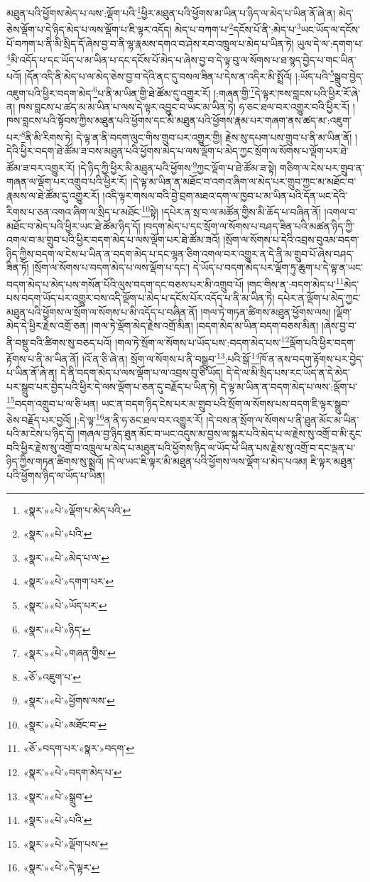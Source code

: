 མཐུན་པའི་ཕྱོགས་མེད་པ་ལས་:ལྡོག་པའི་\footnote{«སྣར་»«པེ་»ལྡོག་པ་མེད་པའི་}ཕྱིར་མཐུན་པའི་ཕྱོགས་མ་ཡིན་པ་ཉིད་ལ་མེད་པ་ཡིན་ནོ་ཞེ་ན། མེད་ཅེས་ལྡོག་པ་དེ་ཉིད་མེད་པ་ལས་ལྡོག་པ་ཇི་ལྟར་འདོད། མེད་པ་བཀག་པ་\footnote{«སྣར་»«པེ་»པའི་}དངོས་པོ་ནི་:མེད་པ་\footnote{«སྣར་»«པེ་»མེད་པ་ལ་}ཡང་ཡོད་ལ་དངོས་པོ་བཀག་པ་ནི་མི་སྲིད་དོ་ཞེས་བྱ་བ་ནི་ལྷ་རྣམས་དགའ་བ་ཤེས་རབ་འཁྲུལ་པ་མེད་པ་ཡིན་ཏེ། ཡུལ་དེ་ལ་:དགག་པ་\footnote{«སྣར་»«པེ་»དགག་པར་}མི་འདོད་པ་དང་ཡོད་པ་མ་ཡིན་པ་དང་དངོས་པོ་མེད་པ་ཞེས་བྱ་བ་དེ་ལྟ་བུ་ལ་སོགས་པ་ཐ་སྙད་བྱེད་པ་གང་ཡིན་པའོ། །དོན་འདི་ནི་མེད་པ་ལ་མེད་ཅེས་བྱ་བ་དེའི་ནང་དུ་བསལ་ཟིན་པ་དེས་ན་འདིར་མི་སྤྲོའོ། །:ཡོད་པའི་\footnote{«སྣར་»«པེ་»ཡོད་པར་}སྒྲུབ་བྱེད་འཇུག་པའི་ཕྱིར་བདག་མེད་\footnote{«སྣར་»«པེ་»ཉིད་}པ་ནི་མ་ཡིན་གྱི་ཐེ་ཚོམ་དུ་འགྱུར་རོ། །:གཞན་གྱི་\footnote{«སྣར་»«པེ་»གཞན་གྱིས་}དེ་ལྟར་ཁས་བླངས་པའི་ཕྱིར་རོ་ཞེ་ན། ཁས་བླངས་པ་ཚད་མ་མ་ཡིན་པ་ལས་དེ་ལྟར་འབྱུང་བ་ཡང་མ་ཡིན་ཏེ། ཧ་ཅང་ཐལ་བར་འགྱུར་བའི་ཕྱིར་རོ། །ཁས་བླངས་པའི་སྟོབས་ཀྱིས་མཐུན་པའི་ཕྱོགས་དང་མི་མཐུན་པའི་ཕྱོགས་རྣམ་པར་གཞག་ནས་ཚད་མ་:འཇུག་པར་\footnote{«ཅོ་»འཇུག་པ་}ནི་མི་རིགས་ཏེ། དེ་ལྟ་ན་ནི་བདག་ལུང་གིས་གྲུབ་པར་འགྱུར་གྱི། རྗེས་སུ་དཔག་པས་གྲུབ་པ་ནི་མ་ཡིན་ནོ། །དེའི་ཕྱིར་བདག་ཐེ་ཚོམ་ཟ་བས་མཐུན་པའི་ཕྱོགས་མེད་པ་ལས་ལྡོག་པ་མེད་ཀྱང་སྲོག་ལ་སོགས་པ་ལྡོག་པར་ཐེ་ཚོམ་ཟ་བར་འགྱུར་རོ། །དེ་ཉིད་ཀྱི་ཕྱིར་མི་མཐུན་པའི་ཕྱོགས་\footnote{«སྣར་»«པེ་»ཕྱོགས་ལས་}ཀྱང་ལྡོག་པ་ཐེ་ཚོམ་ཟ་སྟེ། གཅིག་ལ་ངེས་པར་གྲུབ་ན་གཞན་ལ་ལྡོག་པར་འགྲུབ་པའི་ཕྱིར་རོ། །དེ་ལྟ་མ་ཡིན་ན་མཐོང་བ་འགའ་ཞིག་ལ་མེད་པར་གྲུབ་ཀྱང་མ་མཐོང་བ་རྣམས་ལ་ཐེ་ཚོམ་དུ་འགྱུར་རོ། །འདི་ལྟར་གསལ་བའི་བྱེ་བྲག་མཐའ་དག་ལ་ཁྱབ་པ་མ་ཡིན་པའི་དོན་ཡང་དེའི་རིགས་པ་ཅན་འགའ་ཞིག་ལ་སྲིད་པ་མཐོང་\footnote{«སྣར་»«པེ་»མཐོང་བ་}སྟེ། །དཔེར་ན་སྲ་བ་ལ་མཚོན་གྱིས་མི་ཆོད་པ་བཞིན་ནོ། །འགལ་བ་མཐོང་བ་མེད་པའི་ཕྱིར་ཡང་ཐེ་ཚོམ་ཉིད་དོ། །བདག་མེད་པ་དང་སྲོག་ལ་སོགས་པ་བཤད་ཟིན་པའི་མཚན་ཉིད་ཀྱི་འགལ་བ་མ་གྲུབ་པའི་ཕྱིར་བདག་མེད་པ་ལས་ལྡོག་པར་ཐེ་ཚོམ་ཟའོ། །སྲོག་ལ་སོགས་པ་དེའི་འབྲས་བུའམ་བདག་ཉིད་ཀྱིས་བདག་ལ་ངེས་པ་ཡིན་ན་བདག་མེད་པ་དང་ལྷན་ཅིག་འགལ་བར་འགྱུར་ན་དེ་ནི་མ་གྲུབ་པོ་ཞེས་བཤད་ཟིན་ཏོ། །སྲོག་ལ་སོགས་པ་བདག་མེད་པ་ལས་ལྡོག་པ་དང་། དེ་ཡོད་པ་བདག་མེད་པར་ལྡོག་ཏུ་ཆུག་པ་དེ་ལྟ་ན་ཡང་བདག་མེད་པ་མེད་པས་གསོན་པོའི་ལུས་བདག་དང་བཅས་པར་མི་འགྲུབ་པོ། །གང་གིས་ན་:བདག་མེད་པ་\footnote{«ཅོ་»བདག་པར་«སྣར་»བདག་}མེད་པས་བདག་ཡོད་པར་འགྱུར་བས་འདི་ལྡོག་པ་མེད་པ་དངོས་པོར་འདོད་པ་ནི་མ་ཡིན་ཏེ། དཔེར་ན་ལྡོག་པ་མེད་ཀྱང་མཐུན་པའི་ཕྱོགས་ལ་སྲོག་ལ་སོགས་པ་མི་འདོད་པ་བཞིན་ནོ། །གལ་ཏེ་གཏན་ཚིགས་མཐུན་ཕྱོགས་ལས། །ལྡོག་མེད་དེ་ཕྱིར་རྗེས་འགྲོ་ཅན། །གལ་ཏེ་ལྡོག་མེད་རྗེས་འགྲོ་མིན། །བདག་མེད་མ་ཡིན་བདག་བཅས་མིན། །ཞེས་བྱ་བ་ནི་བསྡུ་བའི་ཚིགས་སུ་བཅད་པའོ། །གལ་ཏེ་སྲོག་ལ་སོགས་པ་ཡོད་པས་:བདག་མེད་པས་\footnote{«སྣར་»«པེ་»བདག་མེད་པ་}ལྡོག་པའི་ཕྱིར་བདག་རྟོགས་པ་ནི་མ་ཡིན་ནོ། །འོ་ན་ཅི་ཞེ་ན། སྲོག་ལ་སོགས་པ་ནི་བསྒྲུབ་\footnote{«སྣར་»«པེ་»སྒྲུབ་}:པའི་སྒོ་\footnote{«སྣར་»«པེ་»པའི་}ཁོ་ན་ནས་བདག་རྟོགས་པར་བྱེད་པ་ཡིན་ནོ་ཞེ་ན། དེ་ནི་བདག་མེད་པ་ལས་ལྡོག་པ་ལ་འབྲས་བུ་ཅི་ཡོད། དེ་དེ་ལ་མི་སྲིད་པས་རང་ཡོད་ན་དེ་མེད་པར་སྒྲུབ་པར་བྱེད་པའི་ཕྱིར་དེ་ལས་ལྡོག་པ་ཅན་དུ་བརྗོད་པ་ཡིན་ཏེ། དེ་ལྟ་མ་ཡིན་ན་བདག་མེད་པ་ལས་:ལྡོག་པ་\footnote{«སྣར་»«པེ་»ལྡོག་པས་}བདག་འགྲུབ་པ་ལ་ཅི་ཕན། ཡང་ན་བདག་ཉིད་ངེས་པར་མ་གྲུབ་པའི་སྲོག་ལ་སོགས་པས་བདག་ཇི་ལྟར་སྒྲུབ་ཅེས་བརྗོད་པར་བྱའོ། །:དེ་ལྟ་\footnote{«སྣར་»«པེ་»དེ་ལྟར་}ན་ནི་ཧ་ཅང་ཐལ་བར་འགྱུར་རོ། །དེ་བས་ན་སྲོག་ལ་སོགས་པ་ནི་ཐུན་མོང་མ་ཡིན་པའི་མ་ངེས་པ་ཉིད་དོ། །གཞལ་བྱ་ཉིད་ཐུན་མོང་བ་ཡང་འདུས་མ་བྱས་ལ་སྐུར་པའི་མེད་པ་ལ་རྗེས་སུ་འགྲོ་བ་མི་རུང་བའི་ཕྱིར་རྗེས་སུ་འགྲོ་བ་འཁྲུལ་པ་མེད་པ་མཐུན་པའི་ཕྱོགས་ཉིད་ལ་ཡོད་པ་ཡིན་པས་རྗེས་སུ་འགྲོ་བ་དང་ལྡན་པ་ཉིད་ཀྱིས་གཏན་ཚིགས་སུ་སྨྲའོ། །དེ་ལ་ཡང་ཇི་ལྟར་མི་མཐུན་པའི་ཕྱོགས་ལས་ལྡོག་པ་མེད་པའམ། ཇི་ལྟར་མཐུན་པའི་ཕྱོགས་ཉིད་ལ་ཡོད་པ་ཡིན། 